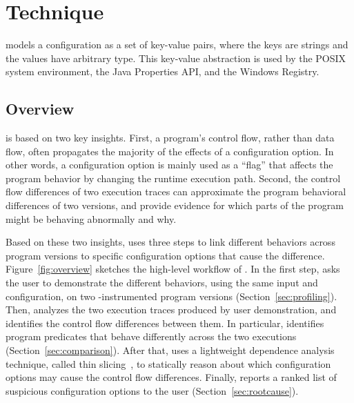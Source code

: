 
\section{Technique}
\label{sec:technique}

\ourtool models a configuration as a set of key-value
pairs, where the keys are strings and the values have
arbitrary type. 
This key-value abstraction
is used by the POSIX system environment, the Java
Properties API, and the Windows Registry.


\subsection{Overview}

\ourtool is based on two key insights. First,
a program's control flow, rather than data flow,
often propagates the majority of
the effects of a configuration option.
In other words, a configuration option is mainly used
as a ``flag'' that affects the program behavior by
changing the runtime execution path.
Second, the control flow differences of two execution
traces can approximate the program behavioral differences
of two versions, and provide evidence
for which parts of the program might be behaving
abnormally and why.

Based on these two insights, \ourtool uses three
steps to link different behaviors across program
versions to specific configuration options that cause the difference.
Figure~\ref{fig:overview} sketches the high-level workflow of
\ourtool. 
In the first step, \ourtool asks the
user to demonstrate the different behaviors, using the same input and
configuration, on two \ourtool-instrumented program versions
(Section~\ref{sec:profiling}).
Then, \ourtool analyzes the two execution traces produced
by user demonstration, and identifies the control flow differences between
them. In particular, \ourtool identifies program predicates
that behave differently across the two executions
(Section~\ref{sec:comparison}).
After that, \ourtool uses a lightweight dependence
analysis technique, called thin slicing~\cite{Sridharan:2007},
to statically reason about which configuration
options may cause the control flow differences.
Finally, \ourtool reports a ranked list of 
suspicious configuration options to the user (Section~\ref{sec:rootcause}).

